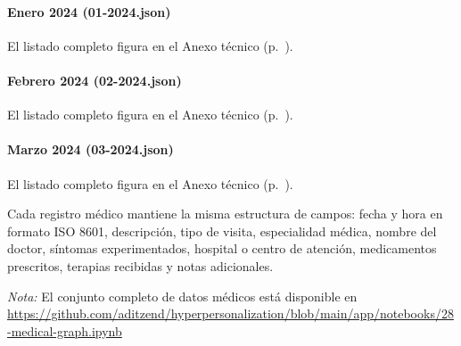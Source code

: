\paragraph{Enero 2024 (01-2024.json)}

El listado completo figura en el Anexo técnico (p.~\pageref{anexo:code-4-3-2-1}).

\paragraph{Febrero 2024 (02-2024.json)}

El listado completo figura en el Anexo técnico (p.~\pageref{anexo:code-4-3-2-2}).

\paragraph{Marzo 2024 (03-2024.json)}

El listado completo figura en el Anexo técnico (p.~\pageref{anexo:code-4-3-2-3}).

Cada registro médico mantiene la misma estructura de campos: fecha y hora en formato ISO 8601, descripción, tipo de visita, especialidad médica, nombre del doctor, síntomas experimentados, hospital o centro de atención, medicamentos prescritos, terapias recibidas y notas adicionales.

\textit{Nota:} El conjunto completo de datos médicos está disponible en \url{https://github.com/aditzend/hyperpersonalization/blob/main/app/notebooks/28-medical-graph.ipynb}
